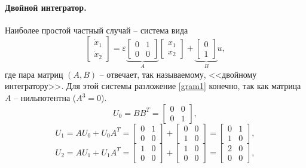 \documentclass[../main.tex]{subfiles}
\begin{document}
 \paragraph{Двойной интегратор.}
 Наиболее простой частный случай -- система вида 
 \begin{equation*}
	 \left[ {\begin{array}{*{20}{c}}
			 {{{\dot x}_1}}\\
			 {{{\dot x}_2}}
	 \end{array}} \right] = \varepsilon \underbrace {\left[ {\begin{array}{*{20}{c}}
				 0&1\\
				 0&0
		 \end{array}} \right]}_A\left[ {\begin{array}{*{20}{c}}
			 {{x_1}}\\
			 {{x_2}}
	 \end{array}} \right] + \underbrace {\left[ {\begin{array}{*{20}{c}}
				 0\\
				 1
		 \end{array}} \right]}_Bu,
 \end{equation*}
 где пара матриц $ (A,B) $ -- отвечает, так называемому, <<двойному интегратору>>.
 Для этой системы разложение \eqref{gram1} конечно, так как матрица $ A $ -- нильпотентна ($ A^3 = 0$).
 \begin{equation*}
	 U_0 = B B^T =  \left[ {\begin{array}{*{20}{c}}
			 0&0\\
			 0&1
	 \end{array}}\right],
 \end{equation*}
 \begin{equation*}
	 U_1 = A U_0 + U_0 A^T = \left[ {\begin{array}{*{20}{c}}
			 0&1\\
			 0&0
	 \end{array}}\right] + \left[ {\begin{array}{*{20}{c}}
			 0&0\\
			 1&0
	 \end{array}}\right] = \left[ {\begin{array}{*{20}{c}}
			 0&1\\
			 1&0
	 \end{array}}\right],
 \end{equation*}
 \begin{equation*}
	 U_2 = A U_1 + U_1 A^T = \left[ {\begin{array}{*{20}{c}}
			 1&0\\
			 0&0
	 \end{array}}\right] + \left[ {\begin{array}{*{20}{c}}
			 1&0\\
			 0&0
	 \end{array}}\right] = \left[ {\begin{array}{*{20}{c}}
			 2&0\\
			 0&0
	 \end{array}}\right],
 \end{equation*}
\end{document}
